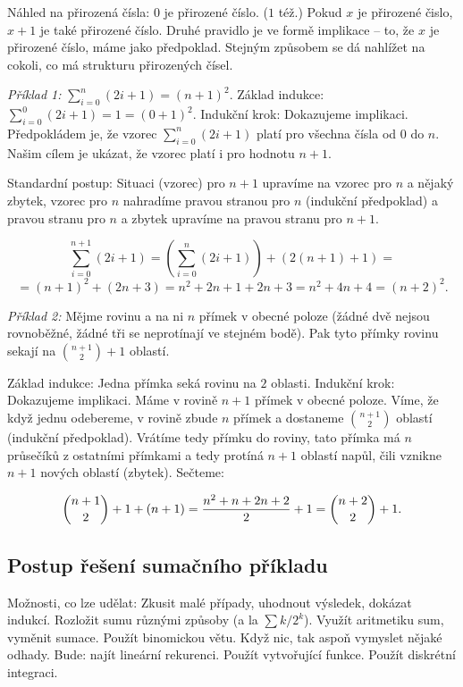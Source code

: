 Náhled na přirozená čísla:
\itemize\ibull
\: $0$ je přirozené číslo. ($1$ též.)
\: Pokud $x$ je přirozené čislo, $x+1$ je také přirozené číslo.
\endlist
Druhé pravidlo je ve formě implikace -- to, že $x$ je přirozené číslo,
máme  jako předpoklad. Stejným způsobem se dá nahlížet na
cokoli, co má  strukturu přirozených čísel.

{\it Příklad 1:} $\sum_{i=0}^n (2i+1) = (n+1)^2$.
\itemize\ibull
\: Základ indukce: $\sum_{i=0}^0 (2i+1) = 1 = (0+1)^2$.
\: Indukční krok: Dokazujeme implikaci. Předpokládem je, že vzorec $\sum_{i=0}^n (2i+1)$ platí pro všechna čísla od $0$ do $n$. Našim cílem je ukázat, že vzorec platí i pro hodnotu $n+1$.

Standardní postup: Situaci (vzorec) pro $n+1$ upravíme na vzorec pro $n$ a nějaký zbytek,
vzorec pro $n$ nahradíme pravou stranou pro $n$ (indukční předpoklad) a pravou stranu pro $n$
a zbytek upravíme na pravou stranu pro $n+1$. 
\endlist

$$ \sum_{i=0}^{n+1} (2i+1) = \left( \sum_{i=0}^n (2i+1) \right) + \left(2(n+1)+1\right) = $$
$$ = (n+1)^2 + (2n+3) = n^2 + 2n +1 + 2n + 3 = n^2 + 4n + 4 = (n+2)^2. $$

{\it Příklad 2:} Mějme rovinu a na ni $n$ přímek v obecné poloze
(žádné dvě nejsou rovnoběžné, žádné tři se neprotínají ve stejném
bodě). Pak tyto přímky rovinu sekají na ${n+1 \choose 2} + 1$ oblastí.

\itemize\ibull
\: Základ indukce: Jedna přímka seká rovinu na $2$ oblasti.
\: Indukční krok: Dokazujeme implikaci. Máme v rovině $n+1$ přímek v
obecné poloze. Víme, že když jednu odebereme, v rovině zbude $n$
přímek a dostaneme ${n+1 \choose 2}$ oblastí (indukční
předpoklad). Vrátíme tedy přímku do roviny, tato přímka má $n$
průsečíků z ostatními přímkami a tedy protíná $n+1$ oblastí napůl,
čili vznikne $n+1$ nových oblastí (zbytek). Sečteme:
\endlist

$${n+1 \choose 2} + 1 + (n+1) = {n^2 + n + 2n + 2 \over 2} + 1 = {n+2 \choose 2} + 1.$$ 

\subsection{Postup řešení sumačního příkladu}
Možnosti, co lze udělat:
\itemize\ibull
\: Zkusit malé případy, uhodnout výsledek, dokázat indukcí.
\: Rozložit sumu různými způsoby (a la $\sum k/2^k$).
\: Využít aritmetiku sum, vyměnit sumace.
\: Použít binomickou větu.
\: Když nic, tak aspoň vymyslet nějaké odhady.
\: Bude: najít lineární rekurenci.
\: Použít vytvořující funkce.
\: Použít diskrétní integraci.
\endlist

